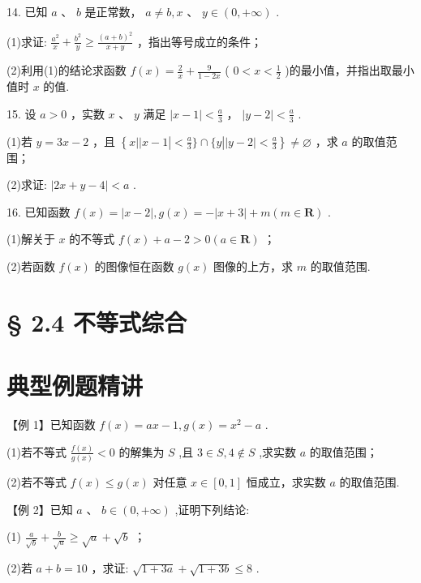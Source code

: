 14. 已知 $a\text{ 、 }b$ 是正常数， $a \neq  b,x\text{ 、 }y \in  \left( {0, + \infty }\right)$ .

(1)求证: $\frac{{a}^{2}}{x} + \frac{{b}^{2}}{y} \geq  \frac{{\left( a + b\right) }^{2}}{x + y}$ ，指出等号成立的条件；

(2)利用(1)的结论求函数 $f\left( x\right)  = \frac{2}{x} + \frac{9}{1 - {2x}}$ ( $0 < x < \frac{1}{2}$ )的最小值，并指出取最小值时 $x$ 的值.

15. 设 $a > 0$ ，实数 $x$ 、 $y$ 满足 $\left| {x - 1}\right|  < \frac{a}{3}$ ， $\left| {y - 2}\right|  < \frac{a}{3}$ .

(1)若 $y = {3x} - 2$ ，且 $\left\{  {x\left| \right| x - 1\left| { < \frac{a}{3}\} \cap \{ y}\right| \left| {y - 2}\right|  < \frac{a}{3}}\right\}   \neq  \varnothing$ ，求 $a$ 的取值范围；

(2)求证: $\left| {{{2x} + y} - 4}\right|  < a$ .

16. 已知函数 $f\left( x\right)  = \left| {x - 2}\right| ,g\left( x\right)  =  - \left| {x + 3}\right|  + m\left( {m \in  \mathbf{R}}\right)$ .

(1)解关于 $x$ 的不等式 $f\left( x\right)  + a - 2 > 0\left( {a \in  \mathbf{R}}\right)$ ；

(2)若函数 $f\left( x\right)$ 的图像恒在函数 $g\left( x\right)$ 图像的上方，求 $m$ 的取值范围.

\section*{§ 2.4 不等式综合}

\section*{典型例题精讲}

【例 1】已知函数 $f\left( x\right)  = {ax} - 1,g\left( x\right)  = {x}^{2} - a$ .

(1)若不等式 $\frac{f\left( x\right) }{g\left( x\right) } < 0$ 的解集为 $S$ ,且 $3 \in  S,4 \notin  S$ ,求实数 $a$ 的取值范围；

(2)若不等式 $f\left( x\right)  \leq  g\left( x\right)$ 对任意 $x \in  \left\lbrack  {0,1}\right\rbrack$ 恒成立，求实数 $a$ 的取值范围.

【例 2】已知 $a\text{ 、 }b \in  \left( {0, + \infty }\right)$ ,证明下列结论:

(1) $\frac{a}{\sqrt{b}} + \frac{b}{\sqrt{a}} \geq  \sqrt{a} + \sqrt{b}$ ；

(2)若 $a + b = {10}$ ，求证: $\sqrt{1 + {3a}} + \sqrt{1 + {3b}} \leq  8$ .

